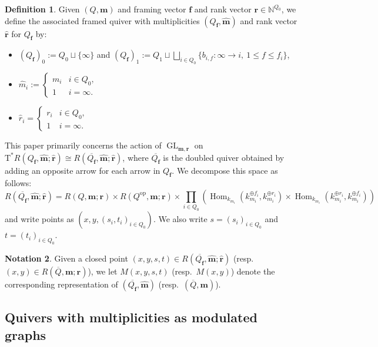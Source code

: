 \documentclass[a4paper,12pt]{article}
\theoremstyle{definition}
\newtheorem{definition}{Definition}[section]
\newtheorem{notation}[definition]{Notation}
\theoremstyle{plain}
\theoremstyle{remark}
\DeclareMathOperator{\GL}{GL}
\DeclareMathOperator{\Hom}{Hom}
\newcommand\bff{\mathbf{f}}
\newcommand\bfm{\mathbf{m}}
\newcommand\bfr{\mathbf{r}}
\begin{document}
\begin{definition}\label{Def quiver with mult associated to framing}
Given $(Q,\bfm)$ and framing vector $\bff$ and rank vector $\bfr \in \mathbb{N}^{Q_0}$, we define the associated framed quiver with multiplicities $(Q_\bff,\widehat{\bfm})$ and rank vector $\widehat{\bfr}$ for $Q_\bff$ by:
\begin{itemize}
\item $(Q_\bff)_0:=Q_0\sqcup\{\infty\}$ and  $(Q_\bff)_1:=Q_1\sqcup\bigsqcup_{i\in Q_0}\{b_{i,f} \colon \infty\rightarrow i,\ 1\leq f\leq f_i\}$,
\item $\widehat{m}_i:=
\left\{
\begin{array}{ll}
m_i & i\in Q_0, \\
1 & i=\infty.
\end{array}
\right.
$
\item $
\widehat{r}_i=
\left\{
\begin{array}{ll}
r_i & i\in Q_0, \\
1 & i=\infty.
\end{array}
\right.
$
\end{itemize}
\end{definition}

This paper primarily concerns the action of $\GL_{\bfm,\bfr}$ on $\mathrm{T}^*R({Q_\bff},\widehat{\bfm};\widehat{\bfr}) \cong R(\overline{Q_\bff},\widehat{\bfm};\widehat{\bfr})$, where $\overline{Q_\bff}$ is the doubled quiver obtained by adding an opposite arrow for each arrow in ${Q_\bff}$. We decompose this space as follows:
\[R(\overline{Q_\bff},\widehat{\bfm};\widehat{\bfr}) = R(Q,\bfm;\bfr) \times R(Q^{\mathrm{op}},\bfm;\bfr) \times \prod_{i \in Q_0} \! \! \left(\Hom_{k_{m_i}}(k^{\oplus f_i}_{m_i},k^{\oplus r_i}_{m_i}) \times \Hom_{k_{m_i}}(k^{\oplus r_i}_{m_i},k_{m_i}^{\oplus f_i}) \right) \]
and write points as $(x,y,(s_i,t_i)_{i \in Q_0})$. We also write $s = (s_i)_{i \in Q_0}$ and $t = (t_i)_{i \in Q_0}$.

\begin{notation}
Given a closed point $(x,y,s,t)\in R(\overline{Q_\bff},\widehat{\bfm};\widehat{\bfr})$ (resp.\ $(x,y)\in R(\overline{Q},\bfm;\bfr)$), we let $M(x,y,s,t)$ (resp.\ $M(x,y)$) denote the corresponding representation of $(\overline{Q_\bff},\widehat{\bfm})$ (resp.\ $(\overline{Q},\bfm)$).
\end{notation}

\subsection{Quivers with multiplicities as modulated graphs}
\end{document}
